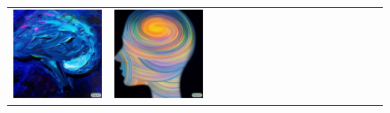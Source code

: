 \begin{figure}[ht!]
\begin{adjustwidth}{-0.8in}{-0.5in}
\begin{tabular}{cccccccccccccccccccc}
\multicolumn{3}{c}{\includegraphics[width=\twobytwocolwidth\textwidth]{figures/cherries/ai_0.jpg}} &
\multicolumn{3}{c}{\includegraphics[width=\twobytwocolwidth\textwidth]{figures/cherries/ai_1.jpg}} \\


\end{tabular}
\end{adjustwidth}
\end{figure}
